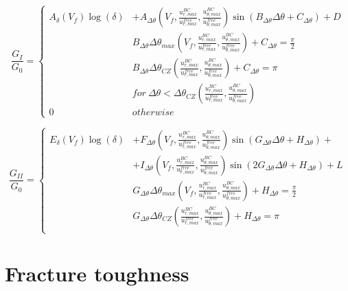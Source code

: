 \documentclass[review]{elsarticle}
\begin{document}
\begin{equation}
\frac{G_{I}}{G_{0}}=\begin{cases}
A_{\delta}\left(V_{f}\right)\log\left(\delta\right)&+A_{\Delta\theta}\left(V_{f},\frac{u^{BC}_{r,max}}{u^{free}_{r,max}},\frac{u^{BC}_{\theta,max}}{u^{free}_{\theta,max}}\right)\sin\left(B_{\Delta\theta}\Delta\theta+C_{\Delta\theta}\right)+D\\
&B_{\Delta\theta}\Delta\theta_{max}\left(V_{f},\frac{u^{BC}_{r,max}}{u^{free}_{r,max}},\frac{u^{BC}_{\theta,max}}{u^{free}_{\theta,max}}\right)+C_{\Delta\theta}=\frac{\pi}{2}\\
&B_{\Delta\theta}\Delta\theta_{CZ}\left(\frac{u^{BC}_{r,max}}{u^{free}_{r,max}},\frac{u^{BC}_{\theta,max}}{u^{free}_{\theta,max}}\right)+C_{\Delta\theta}=\pi\\
&for\ \Delta\theta<\Delta\theta_{CZ}\left(\frac{u^{BC}_{r,max}}{u^{free}_{r,max}},\frac{u^{BC}_{\theta,max}}{u^{free}_{\theta,max}}\right)\\
0&otherwise
\end{cases}
\end{equation}

\begin{equation}
\frac{G_{II}}{G_{0}}=\begin{cases}
E_{\delta}\left(V_{f}\right)\log\left(\delta\right)&+F_{\Delta\theta}\left(V_{f},\frac{u^{BC}_{r,max}}{u^{free}_{r,max}},\frac{u^{BC}_{\theta,max}}{u^{free}_{\theta,max}}\right)\sin\left(G_{\Delta\theta}\Delta\theta+H_{\Delta\theta}\right)+\\&+I_{\Delta\theta}\left(V_{f},\frac{u^{BC}_{r,max}}{u^{free}_{r,max}},\frac{u^{BC}_{\theta,max}}{u^{free}_{\theta,max}}\right)\sin\left(2G_{\Delta\theta}\Delta\theta+H_{\Delta\theta}\right)+L\\
&G_{\Delta\theta}\Delta\theta_{max}\left(V_{f},\frac{u^{BC}_{r,max}}{u^{free}_{r,max}},\frac{u^{BC}_{\theta,max}}{u^{free}_{\theta,max}}\right)+H_{\Delta\theta}=\frac{\pi}{2}\\
&G_{\Delta\theta}\Delta\theta_{CZ}\left(\frac{u^{BC}_{r,max}}{u^{free}_{r,max}},\frac{u^{BC}_{\theta,max}}{u^{free}_{\theta,max}}\right)+H_{\Delta\theta}=\pi\\
\end{cases}
\end{equation}

\section{Fracture toughness}
\end{document}
